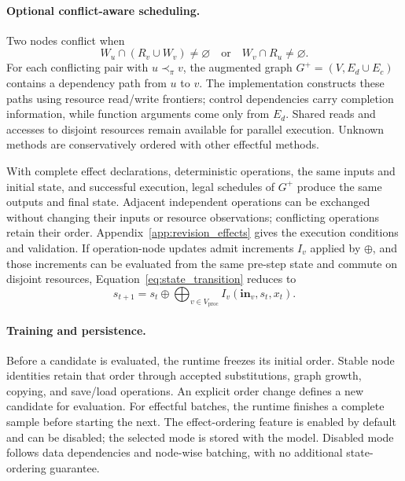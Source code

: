 \paragraph{Optional conflict-aware scheduling.}
Two nodes conflict when
\begin{equation}
W_u\cap(R_v\cup W_v)\ne\varnothing
\quad\text{or}\quad W_v\cap R_u\ne\varnothing.
\end{equation}
For each conflicting pair with $u\prec_\pi v$, the augmented graph $G^+=(V,E_d\cup E_c)$ contains a dependency path from $u$ to $v$. The implementation constructs these paths using resource read/write frontiers; control dependencies carry completion information, while function arguments come only from $E_d$. Shared reads and accesses to disjoint resources remain available for parallel execution. Unknown methods are conservatively ordered with other effectful methods.

With complete effect declarations, deterministic operations, the same inputs and initial state, and successful execution, legal schedules of $G^+$ produce the same outputs and final state. Adjacent independent operations can be exchanged without changing their inputs or resource observations; conflicting operations retain their order. Appendix~\ref{app:revision_effects} gives the execution conditions and validation. If operation-node updates admit increments $I_v$ applied by $\oplus$, and those increments can be evaluated from the same pre-step state and commute on disjoint resources, Equation~\ref{eq:state_transition} reduces to
\begin{equation}
\label{eq:state_parallel}
s_{t+1}=s_t\oplus\bigoplus_{v\in V_{\mathrm{proc}}} I_v(\mathbf{in}_v,s_t,x_t).
\end{equation}

\paragraph{Training and persistence.}
Before a candidate is evaluated, the runtime freezes its initial order. Stable node identities retain that order through accepted substitutions, graph growth, copying, and save/load operations. An explicit order change defines a new candidate for evaluation. For effectful batches, the runtime finishes a complete sample before starting the next. The effect-ordering feature is enabled by default and can be disabled; the selected mode is stored with the model. Disabled mode follows data dependencies and node-wise batching, with no additional state-ordering guarantee.

